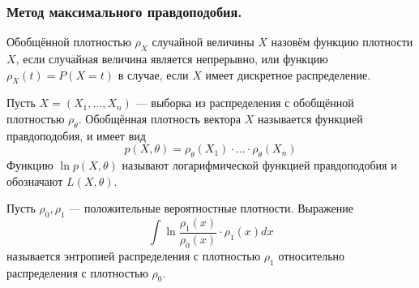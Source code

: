 \subsubsection{Метод максимального правдоподобия.}
\begin{definition}
    Обобщённой плотностью $\rho_X$ случайной величины $X$ назовём функцию плотности $X$, если случайная величина является непрерывно, или функцию
    $\rho_X(t) = P(X = t)$ в случае, если $X$ имеет дискретное распределение.
\end{definition}
\begin{definition}
    Пусть $X = (X_1, \ldots, X_n)$ --- выборка из распределения с обобщённой плотностью $\rho_{\theta}$. Обобщённая плотность вектора $X$ называется функцией
    правдоподобия, и имеет вид
    \[
        p(X, \theta) = \rho_{\theta}(X_1) \cdot \ldots \cdot \rho_{\theta}(X_n)
    \]
    Функцию $\ln p(X, \theta)$ называют логарифмической функцией правдоподобия и обозначают $L(X, \theta)$.
\end{definition}
\begin{definition}
    Пусть $\rho_0, \rho_1$ --- положительные вероятностные плотности. Выражение
    \[
        \int \ln\frac{\rho_1(x)}{\rho_0(x)} \cdot \rho_1(x)dx
    \]
    называется энтропией распределения с плотностью $\rho_1$ относительно распределения с плотностью $\rho_0$.
\end{definition}
\begin{comment}
    Здесь и далее интергралы без пределов интегрирования обозначают интегрирование по множеству, на котором задано распределение. Они вовсе не означают
    неопределённый интеграл.
\end{comment}

